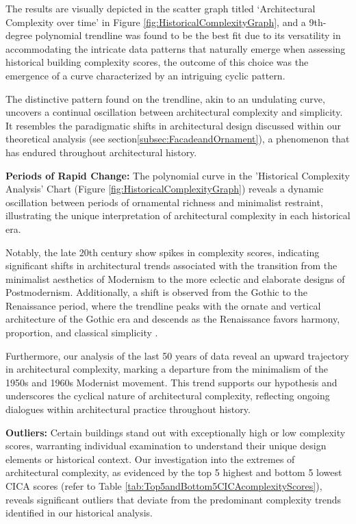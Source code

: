 The results are visually depicted in the scatter graph titled `Architectural Complexity over time' in Figure \ref{fig:HistoricalComplexityGraph}, and a 9th-degree polynomial trendline was found to be the best fit due to its versatility in accommodating the intricate data patterns that naturally emerge when assessing historical building complexity scores, the outcome of this choice was the emergence of a curve characterized by an intriguing cyclic pattern.

The distinctive pattern found on the trendline, akin to an undulating curve, uncovers a continual oscillation between architectural complexity and simplicity.
It resembles the paradigmatic shifts in architectural design discussed within our theoretical analysis (see section\ref{subsec:FacadeandOrnament}), a phenomenon that has endured throughout architectural history.

\textbf{Periods of Rapid Change:}
The polynomial curve in the 'Historical Complexity Analysis' Chart (Figure \ref{fig:HistoricalComplexityGraph}) reveals a dynamic oscillation between periods of ornamental richness and minimalist restraint, illustrating the unique interpretation of architectural complexity in each historical era.

Notably, the late 20th century show spikes in complexity scores, indicating significant shifts in architectural trends associated with the transition from the minimalist aesthetics of Modernism to the more eclectic and elaborate designs of Postmodernism.
Additionally, a shift is observed from the Gothic to the Renaissance period, where the trendline peaks with the ornate and vertical architecture of the Gothic era and descends as the Renaissance favors harmony, proportion, and classical simplicity \cite{Stacbond2020}.

Furthermore, our analysis of the last 50 years of data reveal an upward trajectory in architectural complexity, marking a departure from the minimalism of the 1950s and 1960s Modernist movement.
This trend supports our hypothesis and underscores the cyclical nature of architectural complexity, reflecting ongoing dialogues within architectural practice throughout history.

\textbf{Outliers:} Certain buildings stand out with exceptionally high or low complexity scores, warranting individual examination to understand their unique design elements or historical context.
Our investigation into the extremes of architectural complexity, as evidenced by the top 5 highest and bottom 5 lowest CICA scores (refer to Table \ref{tab:Top5andBottom5CICAcomplexityScores}), reveals significant outliers that deviate from the predominant complexity trends identified in our historical analysis.

